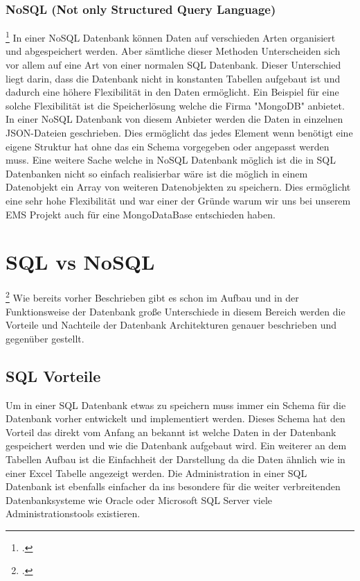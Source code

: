 	\subsubsection{NoSQL (Not only Structured Query Language)}	\footcite{mongodb}
	In einer NoSQL Datenbank können Daten auf verschieden Arten organisiert und abgespeichert werden. Aber sämtliche dieser Methoden Unterscheiden sich vor allem auf eine Art von einer normalen SQL Datenbank. Dieser Unterschied liegt darin, dass die Datenbank nicht in konstanten Tabellen aufgebaut ist und dadurch eine höhere Flexibilität in den Daten ermöglicht. Ein Beispiel für eine solche Flexibilität ist die Speicherlösung welche die Firma "MongoDB" anbietet. In einer NoSQL Datenbank von diesem Anbieter werden die Daten in einzelnen JSON-Dateien geschrieben. Dies ermöglicht das jedes Element wenn benötigt eine eigene Struktur hat ohne das ein Schema vorgegeben oder angepasst werden muss. Eine weitere Sache welche in NoSQL Datenbank möglich ist die in SQL Datenbanken nicht so einfach realisierbar wäre ist die möglich in einem Datenobjekt ein Array von weiteren Datenobjekten zu speichern. Dies ermöglicht eine sehr hohe Flexibilität und war einer der Gründe warum wir uns bei unserem EMS Projekt auch für eine MongoDataBase entschieden haben.
	
	\section{SQL vs NoSQL} \footcite{sqlvsnosql}
		Wie bereits vorher Beschrieben gibt es schon im Aufbau und in der Funktionsweise der Datenbank große Unterschiede in diesem Bereich werden die Vorteile und Nachteile der Datenbank Architekturen genauer beschrieben und gegenüber gestellt.
	
	\subsection{SQL Vorteile}
		Um in einer SQL Datenbank etwas zu speichern muss immer ein Schema für die Datenbank vorher entwickelt und implementiert werden. Dieses Schema hat den Vorteil das direkt vom Anfang an bekannt ist welche Daten in der Datenbank gespeichert werden und wie die Datenbank aufgebaut wird. 
		Ein weiterer an dem Tabellen Aufbau ist die Einfachheit der Darstellung da die Daten ähnlich wie in einer Excel Tabelle angezeigt werden. Die Administration in einer SQL Datenbank ist ebenfalls einfacher da ins besondere für die weiter verbreitenden Datenbanksysteme wie Oracle oder Microsoft SQL Server viele Administrationstools existieren.
		
